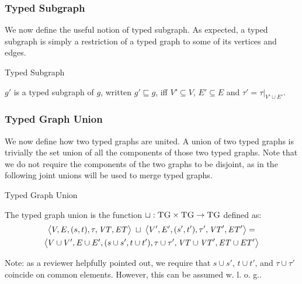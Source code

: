 \subsubsection*{Typed Subgraph}
We now define the useful notion of typed subgraph. As expected, a typed subgraph is simply a restriction of a typed graph to some of its vertices and edges. 

\begin{definition}{Typed Subgraph\\}
\label{def:typedsubgraph}

$g'$ is a typed subgraph of $g$, written $g'\sqsubseteq g$, iff $V'\subseteq V$, $E'\subseteq E$ and $\tau'=\tau |_{V'\cup E'}$.

\end{definition}





\subsubsection*{Typed Graph Union}
We now define how two typed graphs are united. A union of two typed graphs is trivially the set union of all the components of those two typed graphs. Note that we do not require the components of the two graphs to be disjoint, as in the following joint unions will be used to merge typed graphs.

\begin{definition}{Typed Graph Union\\}
\label{def:typed_graph_union}

The typed graph union is the function $\sqcup :\textsc{TG}\times \textsc{TG}\rightarrow \textsc{TG}$ defined as:
\begin{multline*}
\big\langle V,E,(s,t),\tau,\mathit{VT},\mathit{ET}\big\rangle\;\sqcup\;\big\langle V',E',(s',t'),\tau',\mathit{VT}',\mathit{ET}'\big\rangle=\\
\big\langle V\cup V', E\cup E',(s\cup s', t\cup t'), \tau\cup \tau', \mathit{VT}\cup \mathit{VT}', \mathit{ET}\cup ET'\big\rangle
\end{multline*}
\end{definition}

Note: as a reviewer helpfully pointed out, we require that $s \cup s'$, $t \cup t'$, and $\tau \cup \tau'$ coincide on common elements. However, this can be assumed w. l. o. g..


